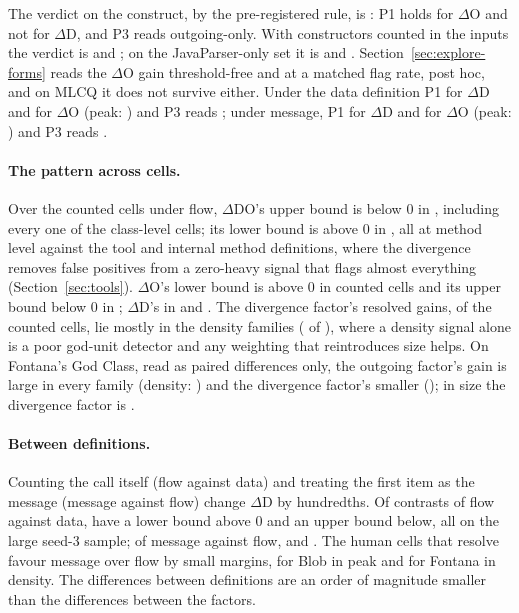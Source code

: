 \documentclass[11pt,a4paper]{article}
\newcommand{\dD}{$\Delta$D}
\newcommand{\dO}{$\Delta$O}
\newcommand{\dDO}{$\Delta$DO}
\begin{document}
The verdict on the construct, by the pre-registered rule, is
\textbf{\consVerdict}: P1 holds for \dO{} and not for \dD{}, and P3 reads
outgoing-only. With constructors counted in the inputs the verdict is \consCtorVerdict{}
and \consCtorAgrees{}; on the JavaParser-only set it is \consJpVerdict{}
and \consJpAgrees{}. Section~\ref{sec:explore-forms} reads the \dO{} gain
threshold-free and at a matched flag rate, post hoc, and on MLCQ it does not
survive either. Under the data definition P1
\pOneDataHolds{} for \dD{} and \pOneDataOHolds{} for \dO{} (peak:
\pOneDataOPeak{}) and P3 reads \pThreeDataReads{}; under message, P1
\pOneMessageHolds{} for \dD{} and \pOneMessageOHolds{} for \dO{} (peak:
\pOneMessageOPeak{}) and P3 reads \pThreeMessageReads{}.

\paragraph{The pattern across cells.} Over the \cellsCountedFlow{} counted
cells under flow, \dDO{}'s upper bound is below 0 in \cellsCountedDOHiBelow{},
including every one of the \cellsCountedClassFlow{} class-level cells; its
lower bound is above 0 in \cellsCountedDOLoAbove{}, all at method level
against the tool and internal method definitions, where the divergence
removes false positives from a zero-heavy signal that flags almost
everything (Section~\ref{sec:tools}). \dO{}'s lower bound is above 0 in
\cellsCountedOLoAbove{} counted cells and its upper bound below 0 in
\cellsCountedOHiBelow{}; \dD{}'s in \cellsCountedDLoAbove{} and
\cellsCountedDHiBelow{}. The divergence factor's resolved gains,
\cellsCountedDLoAbove{} of the \cellsCountedFlow{} counted cells, lie
mostly in the density families (\cellsDensityDLoAbove{} of
\cellsDensityFlow{}), where a density signal alone is a poor god-unit
detector and any weighting that reintroduces size helps.
On Fontana's God Class, read as paired differences only, the outgoing
factor's gain is large in every family (density: \cellFontanaDensityO{})
and the divergence factor's smaller (\cellFontanaDensityD{}); in size the
divergence factor is \cellFontanaSizeD{}.

\paragraph{Between definitions.} Counting the call itself (flow against
data) and treating the first item as the message (message against flow)
change \dD{} by hundredths. Of \betweenCells{} contrasts of flow against
data, \betweenFlowDataLoAbove{} have a lower bound above 0 and
\betweenFlowDataHiBelow{} an upper bound below, all on the large seed-3
sample; of message against flow, \betweenMessageFlowLoAbove{} and
\betweenMessageFlowHiBelow{}. The human cells that resolve favour message
over flow by small margins, \betweenBlobPeakMessageFlow{} for Blob in
peak and \betweenFontanaDensityMessageFlow{} for Fontana in density. The
differences between definitions are an order of magnitude smaller than the
differences between the factors.
\end{document}
